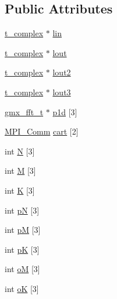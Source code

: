 \subsection*{\-Public \-Attributes}
\begin{DoxyCompactItemize}
\item 
\hyperlink{structt__complex}{t\-\_\-complex} $\ast$ \hyperlink{structfft5d__plan__t_a503a9ccdb7f77408f9ff67edccaddb5e}{lin}
\item 
\hyperlink{structt__complex}{t\-\_\-complex} $\ast$ \hyperlink{structfft5d__plan__t_a945918b770dc7d79c92f7fcc3202745e}{lout}
\item 
\hyperlink{structt__complex}{t\-\_\-complex} $\ast$ \hyperlink{structfft5d__plan__t_a975c57a67192df6f650c3c19b679789c}{lout2}
\item 
\hyperlink{structt__complex}{t\-\_\-complex} $\ast$ \hyperlink{structfft5d__plan__t_ad146941150b0c8bb5e10c19a4d65087a}{lout3}
\item 
\hyperlink{include_2gmx__fft_8h_ac4aa41b4b80187da5d55a98e5f63a025}{gmx\-\_\-fft\-\_\-t} $\ast$ \hyperlink{structfft5d__plan__t_acb821bafbc51c08d34f7f0086daef0ca}{p1d} \mbox{[}3\mbox{]}
\item 
\hyperlink{include_2thread__mpi_2mpi__bindings_8h_a3880364558bd42f832e48ed33e6fafbb}{\-M\-P\-I\-\_\-\-Comm} \hyperlink{structfft5d__plan__t_ade00047d3c4d16e64c8abf1796744c34}{cart} \mbox{[}2\mbox{]}
\item 
int \hyperlink{structfft5d__plan__t_aafa317bd699ead25300ef3153c3ee117}{\-N} \mbox{[}3\mbox{]}
\item 
int \hyperlink{structfft5d__plan__t_afb3ff297713f1ef1d5dce58ad6ea3d82}{\-M} \mbox{[}3\mbox{]}
\item 
int \hyperlink{structfft5d__plan__t_af840919a7c83ab1541e84c54f840e387}{\-K} \mbox{[}3\mbox{]}
\item 
int \hyperlink{structfft5d__plan__t_af4f72880c733b0f42fa7ccb648396b2b}{p\-N} \mbox{[}3\mbox{]}
\item 
int \hyperlink{structfft5d__plan__t_abbf8d8a261eab2dbbde5019738922753}{p\-M} \mbox{[}3\mbox{]}
\item 
int \hyperlink{structfft5d__plan__t_acf1ddc8ba3eb43bf7b48e3eb9d1e8df3}{p\-K} \mbox{[}3\mbox{]}
\item 
int \hyperlink{structfft5d__plan__t_ab510d23f7a782b5feac28c681d625d57}{o\-M} \mbox{[}3\mbox{]}
\item 
int \hyperlink{structfft5d__plan__t_a90ccfdbf72342ae3e8898cdb3df311c2}{o\-K} \mbox{[}3\mbox{]}
\item 

\end{DoxyCompactItemize}
